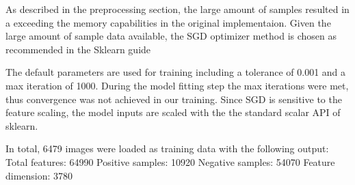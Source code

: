As described in the preprocessing section, the large amount of samples resulted in a exceeding the memory capabilities in the original implementaion.
Given the large amount of sample data available, the SGD optimizer method is chosen as recommended in the Sklearn guide 

The default parameters are used for training including a tolerance of 0.001 and a max iteration of 1000.
During the model fitting step the max iterations were met, thus convergence was not achieved in our training. 
Since SGD is sensitive to the feature scaling, the model inputs are scaled with the the standard scalar API of sklearn.

In total, 6479 images were loaded as training data with the following output:
Total features: 64990
Positive samples: 10920
Negative samples: 54070
Feature dimension: 3780